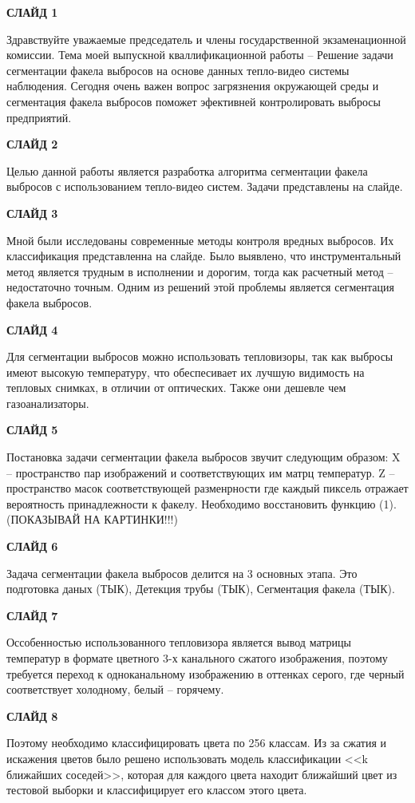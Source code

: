 \documentclass[14pt, a4paper]{extreport}
\begin{document}
	\textbf{СЛАЙД 1}
	
	Здравствуйте уважаемые председатель и члены государственной экзаменационной комиссии. Тема моей выпускной кваллификационной работы -- Решение задачи сегментации
	факела выбросов на основе данных тепло-видео системы наблюдения. Сегодня очень важен вопрос загрязнения окружающей среды и сегментация факела выбросов поможет эфективней контролировать выбросы предприятий.
	
	\textbf{СЛАЙД 2}
	
	Целью данной работы является разработка алгоритма сегментации факела выбросов с использованием тепло-видео систем. Задачи представлены на слайде.
	
	\textbf{СЛАЙД 3}
	
	Мной были исследованы современные методы контроля вредных выбросов. Их классификация представленна на слайде. Было выявлено, что инструментальный метод является трудным в исполнении и дорогим, тогда как расчетный метод -- недостаточно точным. Одним из решений этой проблемы является сегментация факела выбросов.
	
	\textbf{СЛАЙД 4}
	
	Для сегментации выбросов можно использовать тепловизоры, так как выбросы имеют высокую температуру, что обеспесивает их лучшую видимость на тепловых снимках, в отличии от оптических. Также они дешевле чем газоанализаторы. 
	
	\textbf{СЛАЙД 5}
	
	Постановка задачи сегментации факела выбросов звучит следующим образом: X -- пространство пар изображений и соответствующих им матрц температур. Z -- пространство масок соответствующей разменрности где каждый пиксель отражает вероятность принадлежности к факелу. Необходимо восстановить функцию (1). (ПОКАЗЫВАЙ НА КАРТИНКИ!!!)
	
	\textbf{СЛАЙД 6}
	
	Задача сегментации факела выбросов делится на 3 основных этапа. Это подготовка даных (ТЫК), Детекция трубы (ТЫК), Сегментация факела (ТЫК).
	
	\textbf{СЛАЙД 7}
	
	Оссобенностью использованного тепловизора является вывод матрицы температур в формате цветного 3-х канального  сжатого изображения, поэтому требуется переход к одноканальному изображению в оттенках серого, где черный соответствует холодному, белый -- горячему.
	
	\textbf{СЛАЙД 8}
	
	Поэтому необходимо классифицировать цвета по 256 классам. Из за сжатия и искажения цветов было решено использовать модель классификации <<k ближайших соседей>>, которая для каждого цвета находит ближайший цвет из тестовой выборки и классифицирует его классом этого цвета.
	
\end{document}
